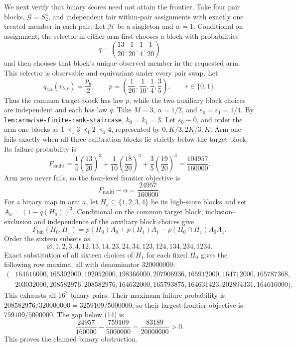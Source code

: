 We next verify that binary scores need not attain the frontier. Take four pair blocks, \(\mathcal G=S_2^4\), and independent fair within-pair assignments with exactly one treated member in each pair. Let \(\mathcal H\) be a singleton and \(w=1\). Conditional on assignment, the selector in either arm first chooses a block with probabilities
\[
q=\left(\frac{13}{20},\frac1{20},\frac14,\frac1{20}\right)
\tag{11}
\]
and then chooses that block's unique observed member in the requested arm. This selector is observable and equivariant under every pair swap. Let
\[
q_{\mathrm{tar}}(v_{b,r})=\frac{p_b}{2},\qquad
p=\left(\frac1{20},\frac1{10},\frac14,\frac35\right),\qquad r\in\{0,1\}.
\tag{12}
\]
Thus the common target block has law \(p\), while the two auxiliary block choices are independent and each has law \(q\). Take \(M=3\), \(\alpha=1/2\), and \(\varepsilon_0=\varepsilon_1=1/4\). By \texttt{lem:armwise-finite-rank-staircase}, \(k_0=k_1=3\). Let \(s_0\equiv0\), and order the arm-one blocks as \(1\prec_1 3\prec_1 2\prec_1 4\), represented by \(0,K/3,2K/3,K\). Arm one fails exactly when all three calibration blocks lie strictly below the target block. Its failure probability is
\[
F_{\mathrm{multi}}=\frac14\left(\frac{13}{20}\right)^3
+\frac1{10}\left(\frac{18}{20}\right)^3
+\frac35\left(\frac{19}{20}\right)^3
=\frac{104957}{160000}.
\tag{13}
\]
Arm zero never fails, so the four-level frontier objective is
\[
F_{\mathrm{multi}}-\alpha=\frac{24957}{160000}.
\tag{14}
\]
For a binary map in arm \(a\), let \(H_a\subseteq\{1,2,3,4\}\) be its high-score blocks and set \(A_a=(1-q(H_a))^3\). Conditional on the common target block, inclusion--exclusion and independence of the auxiliary block choices give
\[
F_{\mathrm{bin}}(H_0,H_1)=p(H_0)A_0+p(H_1)A_1-p(H_0\cap H_1)A_0A_1.
\tag{15}
\]
Order the sixteen subsets as
\[
\varnothing,1,2,3,4,12,13,14,23,24,34,123,124,134,234,1234.
\]
Exact substitution of all sixteen choices of \(H_1\) for each fixed \(H_0\) gives the following row maxima, all with denominator \(320000000\):
\[
\begin{split}
(&164616000,165302000,192052000,198366000,207906936,165912000,164712000,165787368,\\
&203032000,208582976,208582976,164632000,165793875,164631423,202894331,164616000).
\end{split}
\tag{16}
\]
This exhausts all \(16^2\) binary pairs. Their maximum failure probability is \(208582976/320000000=3259109/5000000\), so their largest frontier objective is \(759109/5000000\). The gap below (14) is
\[
\frac{24957}{160000}-\frac{759109}{5000000}=\frac{83189}{20000000}>0.
\tag{17}
\]
This proves the claimed binary obstruction.

